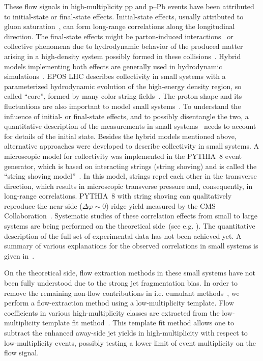 These flow signals in high-multiplicity pp and p--Pb events have been attributed to initial-state or final-state effects. Initial-state effects, usually attributed to gluon saturation~\cite{Dusling:2012cg,Bzdak:2013zma}, can form long-range
correlations along the longitudinal direction. The final-state effects might be parton-induced interactions~\cite{Arbuzov:2011yr} or collective phenomena due to hydrodynamic behavior of the produced matter arising in a high-density system possibly formed in these collisions~\cite{Weller:2017tsr,Zhao:2017rgg}. 
Hybrid models implementing both effects are generally used in hydrodynamic simulations~\cite{Greif:2017bnr,Mantysaari:2017cni}. EPOS LHC describes collectivity in small systems with a parameterized hydrodynamic evolution of the high-energy density region, so called ``core'', formed by many color string fields~\cite{Pierog:2013ria}.
The proton shape and its fluctuations are also important to model small systems~\cite{Mantysaari:2017cni}.
To understand the influence of initial- or final-state effects, and to possibly disentangle the two, a quantitative description of the measurements in small systems~\cite{Schenke:2019pmk,Schenke:2020mbo} needs to account for details of the initial state.
Besides the hybrid models mentioned above, alternative approaches were developed to describe collectivity in small systems. A microscopic model for collectivity was implemented in the PYTHIA~8 event generator, which is based on interacting strings (string shoving) and is called the “string shoving model”~\cite{Bierlich:2017vhg}. In this model, strings repel each other in the transverse direction, which results in microscopic transverse pressure and, consequently, in long-range correlations. PYTHIA~8 with string shoving can qualitatively reproduce the near-side ($\Delta\varphi\sim0$) ridge yield measured by the CMS Collaboration~\cite{Khachatryan:2016txc}.
Systematic studies of these correlation effects from small to large systems are being performed on the theoretical side~(see e.g. \cite{Schenke:2020mbo}).
The quantitative description of the full set of experimental data has not been achieved yet. A summary of various explanations for the observed correlations in small systems is given in~\cite{Strickland:2018exs,Loizides:2016tew,Nagle:2018nvi}. 

On the theoretical side, flow extraction methods in these small systems have not been fully understood due to the strong jet fragmentation bias. In order to remove the remaining non-flow contributions in i.e. cumulant methods~\cite{Bilandzic:2010jr, Acharya:2019vdf}, we perform a flow-extraction method using a low-multiplicity template. Flow coefficients in various high-multiplicity classes are extracted from the low-multiplicity template fit method~\cite{ATLAS:2015hzw,ATLAS:2016yzd}. This template fit method allows one to subtract the enhanced away-side jet yields in high-multiplicity with respect to low-multiplicity events, possibly testing a lower limit of event multiplicity on the flow signal.

